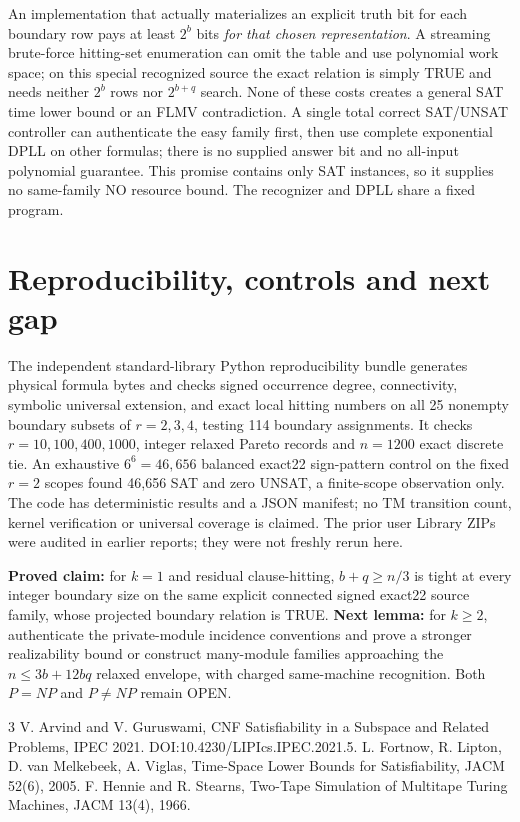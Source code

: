 \documentclass[11pt]{article}
\begin{document}
An implementation that actually materializes an explicit truth bit for each boundary row pays at least $2^b$ bits \emph{for that chosen representation}. A streaming brute-force hitting-set enumeration can omit the table and use polynomial work space; on this special recognized source the exact relation is simply TRUE and needs neither $2^b$ rows nor $2^{b+q}$ search. None of these costs creates a general SAT time lower bound or an FLMV contradiction. A single total correct SAT/UNSAT controller can authenticate the easy family first, then use complete exponential DPLL on other formulas; there is no supplied answer bit and no all-input polynomial guarantee. This promise contains only SAT instances, so it supplies no same-family NO resource bound. The recognizer and DPLL share a fixed program.

\section{Reproducibility, controls and next gap}
The independent standard-library Python reproducibility bundle generates physical formula bytes and checks signed occurrence degree, connectivity, symbolic universal extension, and exact local hitting numbers on all 25 nonempty boundary subsets of $r=2,3,4$, testing 114 boundary assignments. It checks $r=10,100,400,1000$, integer relaxed Pareto records and $n=1200$ exact discrete tie. An exhaustive $6^6=46,656$ balanced exact22 sign-pattern control on the fixed $r=2$ scopes found 46,656 SAT and zero UNSAT, a finite-scope observation only. The code has deterministic results and a JSON manifest; no TM transition count, kernel verification or universal coverage is claimed. The prior user Library ZIPs were audited in earlier reports; they were not freshly rerun here.

\noindent\textbf{Proved claim:} for $k=1$ and residual clause-hitting, $b+q\ge n/3$ is tight at every integer boundary size on the same explicit connected signed exact22 source family, whose projected boundary relation is TRUE. \textbf{Next lemma:} for $k\ge2$, authenticate the private-module incidence conventions and prove a stronger realizability bound or construct many-module families approaching the $n\le3b+12bq$ relaxed envelope, with charged same-machine recognition. Both $P=NP$ and $P\ne NP$ remain OPEN.
\begin{thebibliography}{3}
 V. Arvind and V. Guruswami, CNF Satisfiability in a Subspace and Related Problems, IPEC 2021. DOI:10.4230/LIPIcs.IPEC.2021.5.
 L. Fortnow, R. Lipton, D. van Melkebeek, A. Viglas, Time-Space Lower Bounds for Satisfiability, JACM 52(6), 2005.
 F. Hennie and R. Stearns, Two-Tape Simulation of Multitape Turing Machines, JACM 13(4), 1966.
\end{thebibliography}
\end{document}
